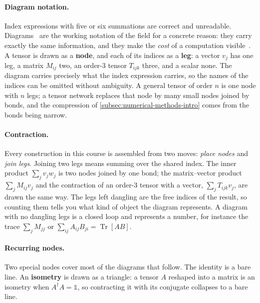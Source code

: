 \paragraph{Diagram notation.}
Index expressions with five or six summations are correct and unreadable.
Diagrams~\cite{Penrose1971} are the working notation of the field for a
concrete reason: they carry exactly the same information, and they make the
\emph{cost} of a computation visible~\cite{Bridgeman2017}.
A tensor is drawn as a \textbf{node}, and each of its indices as a
\textbf{leg}: a vector $v_j$ has one leg, a matrix $M_{ij}$ two, an order-3
tensor $T_{ijk}$ three, and a scalar none. The diagram carries precisely what
the index expression carries, so the names of the indices can be omitted
without ambiguity. A general tensor of order $n$ is one node with $n$ legs; a
tensor network replaces that node by many small nodes joined by bonds, and the
compression of \cref{subsec:numerical-methods-intro} comes from the bonds being
narrow.

\paragraph{Contraction.}
Every construction in this course is assembled from two moves: \emph{place
nodes} and \emph{join legs}. Joining two legs means summing over the shared
index. The inner product $\sum_j v_j w_j$ is two nodes joined by one bond; the
matrix--vector product $\sum_j M_{ij} v_j$ and the contraction of an order-3
tensor with a vector, $\sum_j T_{ijk} v_j$, are drawn the same way. The legs
left dangling are the free indices of the result, so counting them tells you
what kind of object the diagram represents. A diagram with no dangling legs is a
closed loop and represents a number, for instance the trace $\sum_j M_{jj}$ or
$\sum_{ij} A_{ij}B_{ji} = \operatorname{Tr}[AB]$.

\paragraph{Recurring nodes.}
Two special nodes cover most of the diagrams that follow. The identity is a
bare line. An \textbf{isometry} is drawn as a triangle: a tensor $A$ reshaped
into a matrix is an isometry when $A^{\dagger}A = \mathbb{1}$, so contracting
it with its conjugate collapses to a bare line.

